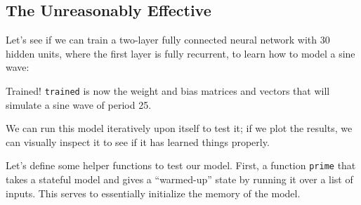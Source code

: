 \documentclass[]{article}
\newenvironment{Shaded}{}{}
\newcommand{\CommentTok}[1]{\textcolor[rgb]{0.38,0.63,0.69}{\textit{#1}}}
\newcommand{\DataTypeTok}[1]{\textcolor[rgb]{0.56,0.13,0.00}{#1}}
\newcommand{\DecValTok}[1]{\textcolor[rgb]{0.25,0.63,0.44}{#1}}
\newcommand{\FunctionTok}[1]{\textcolor[rgb]{0.02,0.16,0.49}{#1}}
\newcommand{\KeywordTok}[1]{\textcolor[rgb]{0.00,0.44,0.13}{\textbf{#1}}}
\newcommand{\NormalTok}[1]{#1}
\newcommand{\OtherTok}[1]{\textcolor[rgb]{0.00,0.44,0.13}{#1}}
\begin{document}
\hypertarget{the-unreasonably-effective}{%
\subsection{The Unreasonably Effective}\label{the-unreasonably-effective}}

Let's see if we can train a two-layer fully connected neural network with 30
hidden units, where the first layer is fully recurrent, to learn how to model a
sine wave:

\begin{Shaded}
\end{Shaded}

Trained! \texttt{trained} is now the weight and bias matrices and vectors that
will simulate a sine wave of period 25.

We can run this model iteratively upon itself to test it; if we plot the
results, we can visually inspect it to see if it has learned things properly.

Let's define some helper functions to test our model. First, a function
\texttt{prime} that takes a stateful model and gives a ``warmed-up'' state by
running it over a list of inputs. This serves to essentially initialize the
memory of the model.
\end{document}
